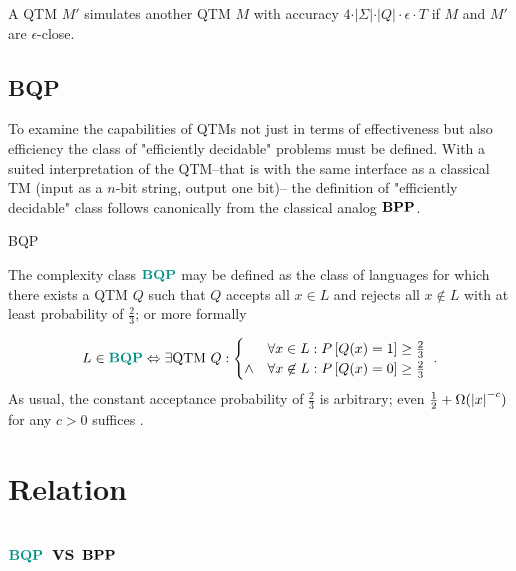 \begin{corollary}
\label{col:etod}
A \ac{QTM} $M'$ simulates another \ac{QTM} $M$ with accuracy $4\cdot\vert\Sigma\vert\cdot\vert Q\vert\cdot\epsilon\cdot T$ if $M$ and $M'$ are $\epsilon$-close.
\end{corollary}



\subsection{\acl{BQP}}

To examine the capabilities of \acp{QTM} not just in terms of effectiveness but also efficiency the class of "efficiently decidable" problems must be defined.
With a suited interpretation of the \ac{QTM}--that is with the same interface as a classical \ac{TM} (input as a $n$-bit string, output one bit)-- the definition of "efficiently decidable" class follows canonically from the classical analog $\mathbf{BPP}$.

\begin{definition}
\label{def:BQP}
\acf{BQP}

The complexity class $\BQP$ may be defined as the class of languages for which there exists a \ac{QTM} $Q$ such that $Q$ accepts all $x\in L$ and rejects all $x\not\in L$ with at least probability of $\frac{2}{3}$; or more formally

\begin{equation*}
    L\in\BQP
    \Leftrightarrow
    \exists\mathrm{QTM}\ Q:
    \begin{cases}
    & \forall x\in L:\Pr{Q(x)=1}\geq\frac{2}{3}
    \\
    \wedge
    & \forall x\not\in L:\Pr{Q(x)=0}\geq\frac{2}{3}
    \end{cases}
    \ .
\end{equation*}
As usual, the constant acceptance probability of $\frac{2}{3}$ is arbitrary; even $\frac{1}{2}+\Omega(\left\vert x\right\vert^{-c})$ for any $c>0$ suffices \cite{arora_barak_2016}.

\end{definition}

\section{Relation}
\label{Relations}

\subsection{$\BQP$ vs $\mathbf{BPP}$}

